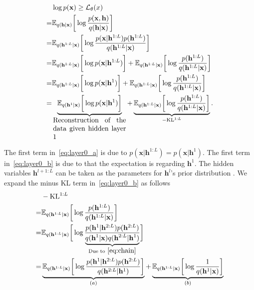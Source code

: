\documentclass{article} %
\begin{document}
\begin{align}  \label{eq:tree_elbo}
&\log p(\mathbf{x})  \geq  \mathcal{L}_{\theta}(x) \\  \notag
=&  \mathbb{E}_{q(\mathbf{h} | \mathbf{x})} \bigg[ \log  \frac{p(\mathbf{x}, \mathbf{h})}{q(\mathbf{h}|\mathbf{x})}  \bigg]  \\  \notag
=&  \mathbb{E}_{q(\mathbf{h}^{1:L} | \mathbf{x})} \bigg[ \log  \frac{p(\mathbf{x} | \mathbf{h}^{1:L}) p( \mathbf{h}^{1:L})}{q(\mathbf{h}^{1:L}|\mathbf{x})}  \bigg]  \\   \notag
 =&  \mathbb{E}_{q(\mathbf{h}^{1:L} | \mathbf{x})} \bigg[  \log p(\mathbf{x} | \mathbf{h}^{1:L})  \bigg]  +  \mathbb{E}_{q(\mathbf{h}^{1:L} | \mathbf{x})} \bigg[ \log   \frac{p( \mathbf{h}^{1:L})}{q(\mathbf{h}^{1:L}|\mathbf{x})}  \bigg]   \\    \label{eq:layer0_a}
=&  \mathbb{E}_{q(\mathbf{h}^{1:L} | \mathbf{x})} \bigg[ \log p(\mathbf{x} | \mathbf{h}^{1})  \bigg]  +  \mathbb{E}_{q(\mathbf{h}^{1:L} | \mathbf{x})} \bigg[ \log     \frac{p( \mathbf{h}^{1:L})}{q(\mathbf{h}^{1:L}|\mathbf{x})}  \bigg]  \\ 
=&  \underbrace{ \mathbb{E}_{q(\mathbf{h}^{1} | \mathbf{x})} \bigg[ \log  p(\mathbf{x} | \mathbf{h}^{1})  \bigg] }_{  \parbox{10.5em}{Reconstruction of the data given hidden layer 1}}  +  \underbrace{  \mathbb{E}_{q(\mathbf{h}^{1:L} | \mathbf{x})} \bigg[ \log  \frac{p( \mathbf{h}^{1:L})}{q(\mathbf{h}^{1:L}|\mathbf{x})}  \bigg] }_{-\text{KL}^{1:L}}.     \label{eq:layer0_b}
\end{align}

The first term in~\eqref{eq:layer0_a} is due to $p(\mathbf{x}|\mathbf{h}^{1:L}) =  p(\mathbf{x}|\mathbf{h}^{1})$. The first term in~\eqref{eq:layer0_b} is due to that the expectation is regarding $\mathbf{h}^{1}$. The hidden variables $\mathbf{h}^{l+1:L}$ can be taken as the parameters for $\mathbf{h}^l$'s  prior distribution .  We expand the minus KL term in~\eqref{eq:layer0_b} as follows
\begin{align} \label{eq:kl_1}
&-\text{KL}^{1:L} \\ \notag
=& \mathbb{E}_{q(\mathbf{h}^{1:L} | \mathbf{x})} \bigg[ \log  \frac{p( \mathbf{h}^{1:L})}{q(\mathbf{h}^{1:L}|\mathbf{x})}  \bigg]   \\ \notag
= &   \mathbb{E}_{q(\mathbf{h}^{1:L} | \mathbf{x})} \bigg[ \log  \frac{p( \mathbf{h}^{1}|  \mathbf{h}^{2:L}) p( \mathbf{h}^{2:L})  }{\underbrace{ q(\mathbf{h}^{1}|\mathbf{x}) q(\mathbf{h}^{2:L}|\mathbf{h}^1)}_{\text{Due to}~\eqref{eq:chain}} }  \bigg] \\ \notag
=&  \underbrace{  \mathbb{E}_{q(\mathbf{h}^{1:L} | \mathbf{x})} \bigg[ \log  \frac{p( \mathbf{h}^{1}|  \mathbf{h}^{2:L}) p( \mathbf{h}^{2:L})  }{ q(\mathbf{h}^{2:L}|\mathbf{h}^1)}  \bigg]  }_{(a)} +   \underbrace{\mathbb{E}_{q(\mathbf{h}^{1:L} | \mathbf{x})} \bigg[ \log \frac{1}{q(\mathbf{h}^{1}|\mathbf{x}) } \bigg] }_{(b)}  \notag
\end{align}
\end{document}
